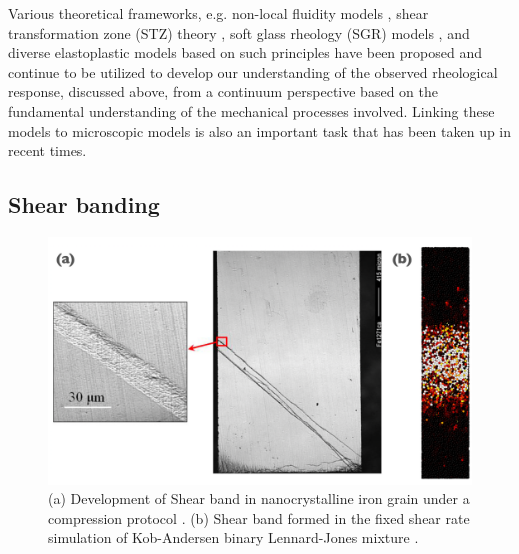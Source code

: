    Various theoretical frameworks, e.g. non-local fluidity models \cite{goyon2008spatial}, shear transformation zone (STZ) theory \cite{falkLanger98}, soft glass rheology (SGR) models \cite{sollich1997rheology,sollich1998rheological}, and diverse elastoplastic models \cite{nicolas2018deformation} based on such principles have been proposed and continue to be utilized to develop our understanding of the observed rheological response, discussed above, from a continuum perspective based on the fundamental understanding of the mechanical processes involved. Linking these models to microscopic models is also an important task that has been taken up in recent times.
    
    \subsection{Shear banding}
    
    \begin{figure}[hbt!]
	\includegraphics[width=14cm]{figs/shearBand.pdf}
	\centering
	\caption[{\em Shear band formation in glassy system}]{(a) Development of Shear band in nanocrystalline iron grain under a compression protocol \cite{wei2002evolution}. (b) Shear band formed in the fixed shear rate simulation of Kob-Andersen binary Lennard-Jones mixture \cite{kob1995testing}.\label{fig_shearBand}}
    \end{figure}
    
